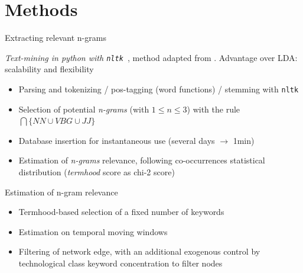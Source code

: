 \documentclass{beamer}
\begin{document}
\section{Methods}
\begin{frame}{Extracting relevant n-grams}
    
    
    \textit{Text-mining in python with \texttt{nltk}~\cite{bird2006nltk}}, method adapted from
\cite{chavalarias2013phylomemetic}. Advantage over LDA: scalability and flexibility

   

\bigskip

\begin{itemize}
\item Parsing and tokenizing / pos-tagging (word functions) / stemming  with \texttt{nltk}
\item Selection of potential \textit{n-grams} (with $1 \leq n \leq 3$) with the rule $\bigcap \{NN \cup VBG \cup JJ \}$
\item Database insertion for instantaneous use (several days $\rightarrow$ 1min)
\item Estimation of \textit{n-grams} relevance, following co-occurrences statistical distribution (\textit{termhood} score as chi-2 score)
\end{itemize}
\end{frame}

\begin{frame}{Estimation of n-gram relevance}
    
    \begin{itemize}
        \item Termhood-based selection of a fixed number of keywords
        \item Estimation on temporal moving windows
        \item Filtering of network edge, with an additional exogenous control by technological class keyword concentration to filter nodes
    \end{itemize}
    
\end{frame}
\end{document}
